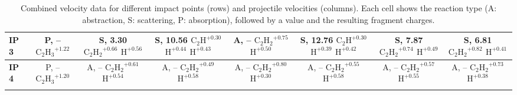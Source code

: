 \begin{table}[t]
\begin{tabular}{lccccccc}
\midrule
\textbf{IP 3} & \makecell{P, -- \\ $\mathrm{C_2H_3}^{+1.22}$} &
\makecell{S, 3.30 \\ $\mathrm{C_2H_2}^{+0.66}$ \\ $\mathrm{H}^{+0.56}$} &
\makecell{S, 10.56 \\ $\mathrm{C_2H}^{+0.30}$ \\ $\mathrm{H}^{+0.44}$ \\ $\mathrm{H}^{+0.43}$} &
\makecell{A, -- \\ $\mathrm{C_2H_2}^{+0.75}$ \\ $\mathrm{H}^{+0.50}$} &
\makecell{S, 12.76 \\ $\mathrm{C_2H}^{+0.30}$ \\ $\mathrm{H}^{+0.39}$ \\ $\mathrm{H}^{+0.42}$} &
\makecell{S, 7.87 \\ $\mathrm{C_2H_2}^{+0.74}$ \\ $\mathrm{H}^{+0.49}$} &
\makecell{S, 6.81 \\ $\mathrm{C_2H_2}^{+0.82}$ \\ $\mathrm{H}^{+0.41}$} \\
\midrule
\textbf{IP 4} & \makecell{P, -- \\ $\mathrm{C_2H_3}^{+1.20}$} &
\makecell{A, -- \\ $\mathrm{C_2H_2}^{+0.61}$ \\ $\mathrm{H}^{+0.54}$} &
\makecell{A, -- \\ $\mathrm{C_2H_2}^{+0.49}$ \\ $\mathrm{H}^{+0.58}$} &
\makecell{A, -- \\ $\mathrm{C_2H_2}^{+0.80}$ \\ $\mathrm{H}^{+0.30}$} &
\makecell{A, -- \\ $\mathrm{C_2H_2}^{+0.55}$ \\ $\mathrm{H}^{+0.58}$} &
\makecell{A, -- \\ $\mathrm{C_2H_2}^{+0.57}$ \\ $\mathrm{H}^{+0.55}$} &
\makecell{A, -- \\ $\mathrm{C_2H_2}^{+0.73}$ \\ $\mathrm{H}^{+0.38}$} \\
\arrayrulecolor{black}
\bottomrule
\end{tabular}
\caption{Combined velocity data for different impact points (rows) and projectile velocities (columns). Each cell shows the reaction type (A: abstraction, S: scattering, P: absorption), followed by a value and the resulting fragment charges.}
\label{tab:combined_velocity_data}
\end{table}
    